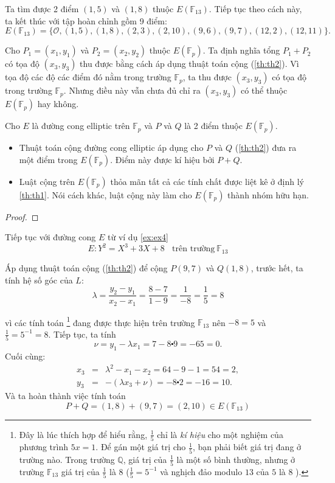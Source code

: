 Ta tìm được 2 điểm $(1,5)$ và $(1,8)$ thuộc $E(\mathbb{F}_{13})$. Tiếp tục theo cách này, ta kết thúc với tập hoàn chỉnh gồm 9 điểm:
$$E(\mathbb{F}_{13}) = \{ \mathcal{O}, (1,5), (1,8), (2,3), (2,10), (9,6), (9,7), (12,2), (12,11)\}.$$

Cho $P_1 = (x_1, y_1)$ và $P_2 = (x_2, y_2)$ thuộc $E(\mathbb{F}_{p})$. Ta định nghĩa tổng $P_1+P_2$ có tọa độ $(x_3, y_3)$ thu được bằng cách áp dụng thuật toán cộng (\ref{th:th2}).
Vì tọa độ các độ các điểm đó nằm trong trường $\mathbb{F}_p$, ta thu được $(x_3, y_3)$ có tọa độ trong trường $\mathbb{F}_p$. Nhưng điều này vẫn chưa đủ chỉ ra
$(x_3, y_3)$ có thể thuộc $E(\mathbb{F}_{p})$ hay không.

\begin{theorem}
	\label{th:th3}
	Cho $E$ là đường cong elliptic trên $\mathbb{F}_p$ và $P$ và $Q$ là 2 điểm thuộc $E(\mathbb{F}_{p})$.
	\begin{itemize}
		\item Thuật toán cộng đường cong elliptic áp dụng cho $P$ và $Q$ (\ref{th:th2}) đưa ra một điểm trong $E(\mathbb{F}_{p})$.
		      Điểm này được kí hiệu bởi $P + Q$.
		\item Luật cộng trên $E(\mathbb{F}_{p})$ thỏa mãn tất cả các tính chất được liệt kê ở định lý \ref{th:th1}.
		      Nói cách khác, luật cộng này làm cho $E(\mathbb{F}_{p})$ thành nhóm hữu hạn.
	\end{itemize}
\end{theorem}

\begin{proof}

\end{proof}

\begin{example}
	\label{ex:ex5}
	Tiếp tục với đường cong $E$ từ ví dụ \ref{ex:ex4}
	$$ E: Y^2 = X^3 + 3X + 8 \ \ \ \ \text{trên trường}\  \mathbb{F}_{13} $$
\end{example}
Áp dụng thuật toán cộng (\ref{th:th2}) để cộng $P(9,7)$ và $Q(1,8)$, trước hết, ta tính hệ số góc của $L$:
$$\lambda  =\frac{y_2-y_1}{x_2-x_1} = \frac{8-7}{1-9} = \frac{1}{-8} = \frac{1}{5} = 8$$

vì các tính toán \footnote{Đây là lúc thích hợp để hiểu rằng, $\frac{1}{5}$ chỉ là \textit{kí hiệu} cho một nghiệm của phương trình $5x=1$.
	Để gán một giá trị cho $\frac{1}{5}$, bạn phải biết giá trị đang ở trường nào. Trong trường $\mathbb{Q}$, giá trị của $\frac{1}{5}$ là một số bình thường,
	nhưng ở trường $\mathbb{F}_{13}$ giá trị của $\frac{1}{5}$ là $8$ ($\frac{1}{5} = 5^{-1}$ và nghịch đảo modulo $13$ của $5$ là $8$ ).} đang được thực hiện trên trường $\mathbb{F}_{13}$ nên $-8 = 5$ và $\frac{1}{5} = 5^{-1} = 8$.
Tiếp tục, ta tính
$$\nu = y_1 - \lambda x_1 = 7 - 8 \centerdot 9 = -65 = 0.$$
Cuối cùng:
$$
	\begin{array}{rcl}
		x_3 & = & \lambda^2 - x_1 - x_2 = 64 -9 -1 = 54 = 2,         \\
		y_3 & = & -(\lambda x_3 + \nu) = -8 \centerdot 2 = -16 = 10.
	\end{array}
$$
Và ta hoàn thành việc tính toán
$$P+Q = (1,8) + (9,7) = (2,10) \in E(\mathbb{F}_{13})$$

